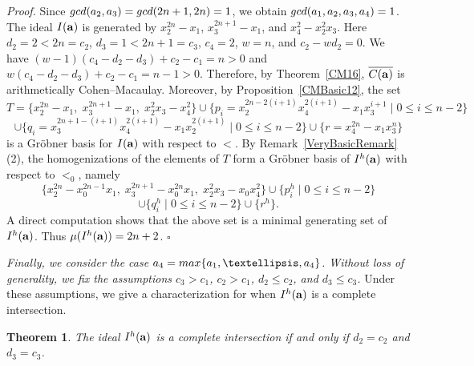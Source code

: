 \documentclass[10pt,a4paper]{amsart}
\newtheorem{thm1}{Theorem}[section]
\begin{document}
{\em \noindent Proof.} Since ${\rm gcd}(a_2,a_3)={\rm gcd}(2n+1,2n)=1$, we obtain
${\rm gcd}(a_1,a_2,a_3,a_4)=1$. The ideal $I({\bf a})$ is generated by
$x_{2}^{2n}-x_1$, $x_{3}^{2n+1}-x_{1}$, and $x_{4}^{2}-x_{2}^{2}x_{3}$. Here $d_2=2<2n=c_2$, $d_3=1<2n+1=c_3$, $c_4=2$,
$w=n$, and $c_2-wd_2=0$. We have
$(w-1)(c_4-d_2-d_3)+c_2-c_1=n>0$ and
$w(c_4-d_2-d_3)+c_2-c_1=n-1>0$. Therefore, by Theorem~\ref{CM16},
$\overline{C({\bf a})}$ is arithmetically Cohen--Macaulay. Moreover, by
Proposition~\ref{CMBasic12}, the set
$$T=\{x_{2}^{2n}-x_1,\; x_{3}^{2n+1}-x_{1},\; x_{2}^{2}x_3-x_{4}^2\}
\cup \{p_{i}=x_{2}^{2n-2(i+1)}x_{4}^{2(i+1)}-x_{1}x_3^{i+1}
\mid 0 \leq i \leq n-2\}$$
$$\cup \{q_{i}=x_{3}^{2n+1-(i+1)}x_{4}^{2(i+1)}-x_{1}x_{2}^{2(i+1)}
\mid 0 \leq i \leq n-2\}
\cup \{r=x_{4}^{2n}-x_{1}x_{3}^{n}\}$$
is a Gr\"obner basis for $I({\bf a})$ with respect to $<$. By Remark~\ref{VeryBasicRemark} (2), the homogenizations of the elements of $T$
form a Gr\"obner basis of $I^{h}({\bf a})$ with respect to $<_0$, namely
$$\{x_{2}^{2n}-x_{0}^{2n-1}x_1,\; x_{3}^{2n+1}-x_{0}^{2n}x_1,\;
x_{2}^{2}x_3-x_{0}x_{4}^{2}\}
\cup \{p^{h}_{i} \mid 0 \leq i \leq n-2\}$$
$$\cup \{q^{h}_{i} \mid 0 \leq i \leq n-2\} \cup \{r^{h}\}.$$ A direct computation shows that the above set is a minimal
generating set of $I^{h}({\bf a})$. Thus $\mu(I^{h}({\bf a}))=2n+2$.
\hfill $\square$  \par\vspace{0.5\baselineskip}

{\em Finally, we consider the case $a_{4}={\rm max}\{a_1,\ldots,a_4\}$. Without loss of generality, we fix the assumptions $c_{3}>c_{1}$, $c_{2}>c_{1}$, $d_{2} \leq c_2$, and $d_{3} \leq c_3$.} Under these assumptions, we give a characterization for when $I^{h}({\bf a})$ is a complete intersection.

\begin{thm1} \label{Comp2} The ideal $I^{h}({\bf a})$ is a complete intersection if and only if $d_{2}=c_2$ and $d_{3}=c_{3}$.
\end{thm1}
\end{document}
